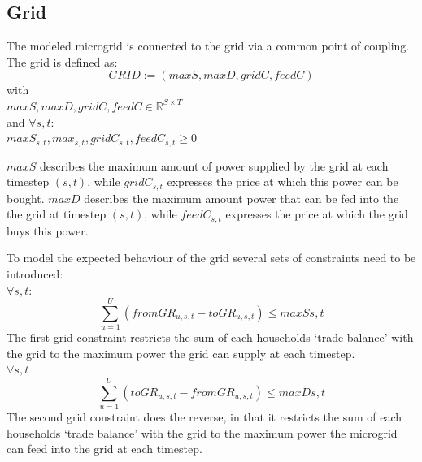 \documentclass[
	11pt,								%
	DIV10,								%
	a4paper,         					%
	oneside,							%
	headheight=20pt,					%
	footheight=20pt,					%
    parskip=full,						%
    listof=totoc,						%
	bibliography=totoc,					%
	index=totoc,						%
]{scrartcl}
\begin{document}
\subsection{Grid}
The modeled microgrid is connected to the grid via a common point of coupling. The grid is defined as:
\begin{equation}
	GRID:= (maxS, maxD, gridC, feedC)
\end{equation}
with\\
$maxS,maxD, gridC, feedC \in \mathbb{R}^{S \times T}$\\
and $\forall s,t$: \\
$maxS_{s,t}, max_{s,t}, gridC_{s,t}, feedC_{s,t} \geq 0$

$maxS$ describes the maximum amount of power supplied by the grid at each timestep $(s,t)$, while $gridC_{s,t}$ expresses the price at which this power can be bought.
$maxD$ describes the maximum amount power that can be fed into the the grid at timestep $(s,t)$, while $feedC_{s,t}$ expresses the price at which the grid buys this power. 

To model the expected behaviour of the grid several sets of constraints need to be introduced:
\\
$\forall s,t$:
\begin{equation}
	\sum_{u=1}^{U}(fromGR_{u,s,t}-toGR_{u,s,t}) \leq maxS{s,t}
\end{equation}
The first grid constraint restricts the sum of each households `trade balance' with the grid to the maximum power the grid can supply at each timestep.
\\
$\forall s,t$
\begin{equation}
	\sum_{u=1}^{U}(toGR_{u,s,t}-fromGR_{u,s,t}) \leq maxD{s,t}
\end{equation}
The second grid constraint does the reverse, in that it restricts the sum of each households `trade balance' with the grid to the maximum power the microgrid can feed into the grid at each timestep.
\end{document}
